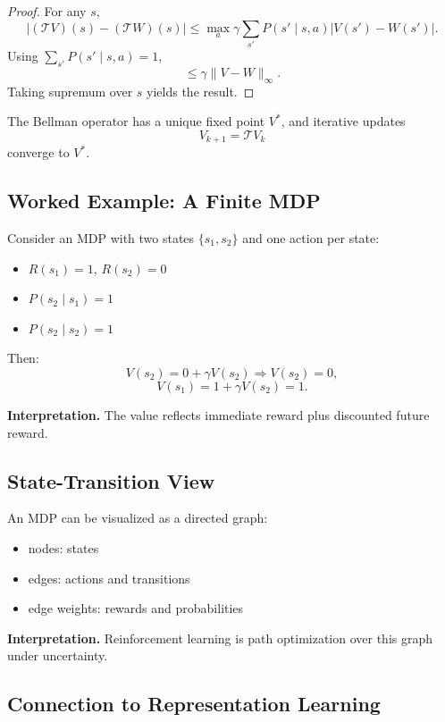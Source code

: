 \begin{proof}
For any $s$,
\[
|(\mathcal{T}V)(s) - (\mathcal{T}W)(s)|
\le \max_a \gamma \sum_{s'} P(s' \mid s,a) |V(s') - W(s')|.
\]
Using $\sum_{s'} P(s' \mid s,a)=1$,
\[
\le \gamma \|V - W\|_\infty.
\]
Taking supremum over $s$ yields the result.
\end{proof}

\begin{corollary}
The Bellman operator has a unique fixed point $V^*$, and iterative updates
\[
V_{k+1} = \mathcal{T}V_k
\]
converge to $V^*$.
\end{corollary}

\subsection{Worked Example: A Finite MDP}

Consider an MDP with two states $\{s_1, s_2\}$ and one action per state:

\begin{itemize}
\item $R(s_1) = 1$, $R(s_2) = 0$
\item $P(s_2 \mid s_1) = 1$
\item $P(s_2 \mid s_2) = 1$
\end{itemize}

Then:
\[
V(s_2) = 0 + \gamma V(s_2) \Rightarrow V(s_2)=0,
\]
\[
V(s_1) = 1 + \gamma V(s_2) = 1.
\]

\medskip

\noindent
\textbf{Interpretation.}  
The value reflects immediate reward plus discounted future reward.

\subsection{State-Transition View}

An MDP can be visualized as a directed graph:
\begin{itemize}
\item nodes: states
\item edges: actions and transitions
\item edge weights: rewards and probabilities
\end{itemize}

\medskip

\noindent
\textbf{Interpretation.}  
Reinforcement learning is path optimization over this graph under uncertainty.

\subsection{Connection to Representation Learning}

